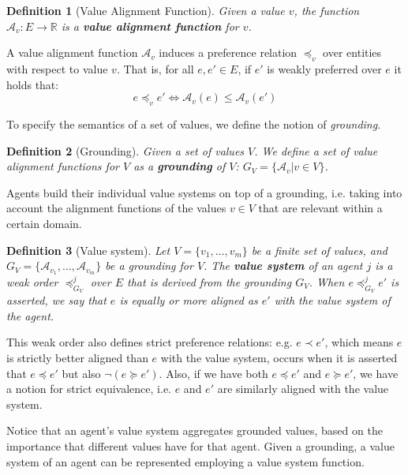 \documentclass{ecai}
\newtheorem{definition}{Definition}
\newcommand{\R}{\mathbb{R}}
\newcommand{\A}{\mathcal{A}}
\begin{document}
\begin{definition}[Value Alignment Function]\label{def:value-alignment-function}
     Given a value $v$, the function $\A_v: E \to \R$ is a \textbf{value alignment function} for $v$. 
\end{definition}

A value alignment function $\A_v$ induces a preference relation $\preccurlyeq_v$ over entities with respect to value $v$. That is, for all $e,e' \in E$, if  $e'$ is weakly preferred over $e$ it holds that:
    $$e \preccurlyeq_v e' \iff \A_v(e) \leq \A_v(e') $$


To specify the semantics of a set of values, we define the notion of \textit{grounding}.

\begin{definition}[Grounding]\label{def:grounding}
     Given a set of values $V$. We define a set of value alignment functions for $V$ as a \textbf{grounding} of $V$: $G_V=\{\A_{v} | v \in V\}$. 
\end{definition}

Agents build their individual value systems on top of a grounding, i.e. taking into account the alignment functions of the values $v \in V$ that are relevant within a certain domain. 

\begin{definition}[Value system]\label{def:value-system}
Let $V = \{v_1, ..., v_m\}$ be a finite set of values, and $G_V=\{\A_{v_1},..., \A_{v_m}\}$ be a grounding for $V$. The \textbf{value system} of an agent $j$ is a weak order $\preccurlyeq^j_{G_V}$ over $E$ 
that is derived from the grounding $G_V$. When $e\preccurlyeq^j_{G_V} e'$ is asserted, we say that $e$ is equally or more aligned as $e'$ with the value system of the agent. 

\end{definition}
This weak order also defines strict preference relations: e.g. $e\prec e'$, which means $e$ is strictly better aligned than $e$ with the value system, occurs when it is asserted that $e \preccurlyeq e'$ but also $\neg (e\succcurlyeq e')$. Also, if we have both $e \preccurlyeq e'$ and $e \succcurlyeq e'$, we have a notion for strict equivalence, i.e. $e$ and $e'$ are similarly aligned with the value system.

Notice that an agent's value system aggregates grounded values, based on the importance that different values have for that agent. 
Given a grounding, a value system of an agent can be represented employing a value system function.
\end{document}
